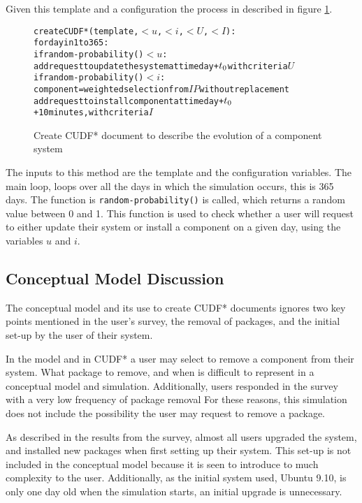 Given this template and a configuration the process in described in figure \ref{sim.CUDF*}.
\begin{figure}[h]
\begin{center}
\begin{alltt}
createCUDF*(template, \(< u\), \(< i\), \(< U\), \(< I\)):
  for day in 1 to 365:
    if random-probability() \(< u\):
      add request to update the system at time day + \(t\sb{0}\) with criteria \(U\)
    if random-probability() \(< i\):  
      component = weighted selection from \(IP\) without replacement 
      add request to install component at time day + \(t\sb{0}\) + 10 minutes, with criteria \(I\)
\end{alltt}
  \caption{Create CUDF* document to describe the evolution of a component system}
  \label{sim.CUDF*}
\end{center}
\end{figure}

The inputs to this method are the template and the configuration variables.
The main loop, loops over all the days in which the simulation occurs, this is 365 days.
The function is \texttt{random-probability()} is called, which returns a random value between 0 and 1.
This function is used to check whether a user will request to either update their system or install a component on a given day, using the variables $u$ and $i$. 

\subsection{Conceptual Model Discussion}
The conceptual model and its use to create CUDF* documents ignores two key points mentioned in the user's survey,
the removal of packages, and the initial set-up by the user of their system.

In the \modelname model and in CUDF* a user may select to remove a component from their system.
What package to remove, and when is difficult to represent in a conceptual model and simulation.
Additionally, users responded in the survey with a very low frequency of package removal
For these reasons, this simulation does not include the possibility the user may request to remove a package.

As described in the results from the survey, almost all users upgraded the system, and installed new packages when first setting up their system.
This set-up is not included in the conceptual model because it is seen to introduce to much complexity to the user.
Additionally, as the initial system used, Ubuntu 9.10, is only one day old when the simulation starts, an initial upgrade is unnecessary.

